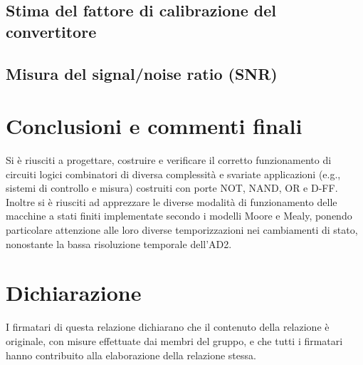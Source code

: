 \documentclass[10pt, a4paper, italian]{article}
\begin{document}
\subsection{Stima del fattore di calibrazione del convertitore}


\subsection{Misura del signal/noise ratio (SNR)}


\section*{Conclusioni e commenti finali}
Si è riusciti a progettare, costruire e verificare il corretto funzionamento
di circuiti logici combinatori di diversa complessità e svariate applicazioni
(e.g., sistemi di controllo e misura) costruiti con porte NOT, NAND, OR e D-FF.
Inoltre si è riusciti ad apprezzare le diverse modalità di funzionamento delle
macchine a stati finiti implementate secondo i modelli Moore e Mealy, ponendo
particolare attenzione alle loro diverse temporizzazioni nei cambiamenti di
stato, nonostante la bassa risoluzione temporale dell'AD2.

\section*{Dichiarazione}
I firmatari di questa relazione dichiarano che il contenuto della relazione \`e
originale, con misure effettuate dai membri del gruppo, e che tutti i firmatari
hanno contribuito alla elaborazione della relazione stessa.
\end{document}
